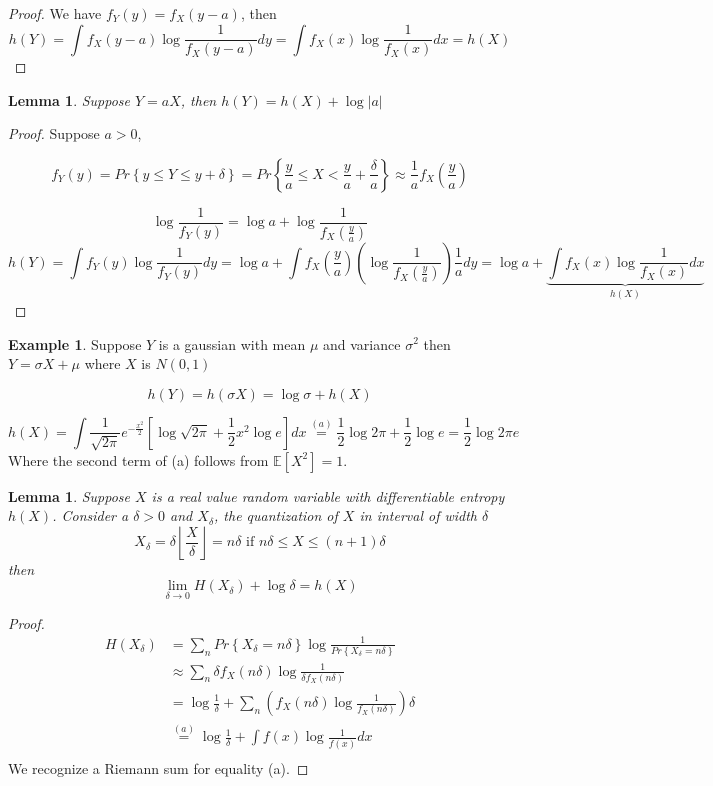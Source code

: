 \documentclass[twoside]{article}
\newtheorem{lemma}[theorem]{Lemma}
\theoremstyle{definition} %
\newtheorem{example}{Example}
\renewcommand{\Pr}[1]{Pr\left\{#1\right\}}
\newcommand{\Ex}[1]{\mathbb{E}\left[#1\right]}
\newcommand{\pfrac}[2]{\left( \frac{#1}{#2} \right)}
\newcommand{\overeq}[1]{\stackrel{#1}{=}}
\begin{document}
\begin{proof}
  We have $f_Y(y) = f_X(y-a)$, then
  \[
    h(Y) = \int f_X(y-a) \log \frac 1 {f_X(y-a)}dy = \int f_X(x) \log \frac 1 {f_X(x)}dx = h(X)
  \]
\end{proof}

\begin{lemma}
  Suppose $Y=aX$, then $h(Y) = h(X) + \log |a|$
\end{lemma}

\begin{proof}
  Suppose $a > 0$,

  \[
    f_Y(y) = \Pr{y\leq Y \leq y + \delta} = \Pr{\frac y a \leq X < \frac y a + \frac \delta a} \approx \frac 1 a f_X \pfrac y a
  \]

  \[
    \log \frac 1 {f_Y(y)} = \log a + \log \frac 1 {f_X\pfrac y a}
  \]
  \[
    h(Y) = \int f_Y(y) \log \frac 1 {f_Y(y)} dy = \log a + \int f_X \pfrac y a \left(\log \frac 1 {f_X\pfrac y a} \right) \frac 1 a dy = \log a + \underbrace{\int f_X(x) \log \frac 1 {f_X(x)} dx}_{h(X)}
  \]
\end{proof}

\begin{example}
  Suppose $Y$ is a gaussian with mean $\mu$ and variance $\sigma^2$ then $Y=\sigma X + \mu$ where $X$ is $N(0,1)$

  \[
    h(Y) = h(\sigma X) = \log \sigma + h(X)
  \]

  \[
    h(X) = \int \frac 1 {\sqrt{2\pi}} e^{-\frac {x^2} 2} \left[ \log \sqrt{2\pi} + \frac 1 2 x^2 \log e \right] dx
    \overeq{(a)} \frac 1 2 \log 2\pi + \frac 1 2 \log e = \frac 1 2 \log 2\pi e
  \]
  Where the second term of (a) follows from $\Ex{X^2} = 1$.
\end{example}

\begin{lemma}
  Suppose $X$ is a real value random variable with differentiable entropy $h(X)$. Consider a $\delta > 0$ and $X_\delta$, the quantization of $X$ in interval of width $\delta$
  \[
    X_\delta = \delta \left\lfloor \frac X \delta \right\rfloor = n\delta \text{ if } n\delta \leq X \leq (n+1) \delta
  \]
  then
  \[
    \lim_{\delta \to 0} H(X_\delta) + \log \delta = h(X)
  \]
\end{lemma}

\begin{proof}
\begin{align*}
  H(X_\delta) &= \sum_n \Pr{X_\delta = n\delta} \log \frac 1 {\Pr{X_\delta = n\delta}}\\
  &\approx \sum_n \delta f_X(n\delta) \log \frac 1 {\delta f_X(n\delta)}\\
  &= \log \frac 1 \delta + \sum_n \left(f_X(n\delta) \log \frac 1 {f_X(n\delta)} \right)\delta\\
  &\overeq{(a)} \log \frac 1 \delta + \int f(x) \log \frac 1 {f(x)} dx\\
\end{align*}
We recognize a Riemann sum for equality (a).
\end{proof}
\end{document}
